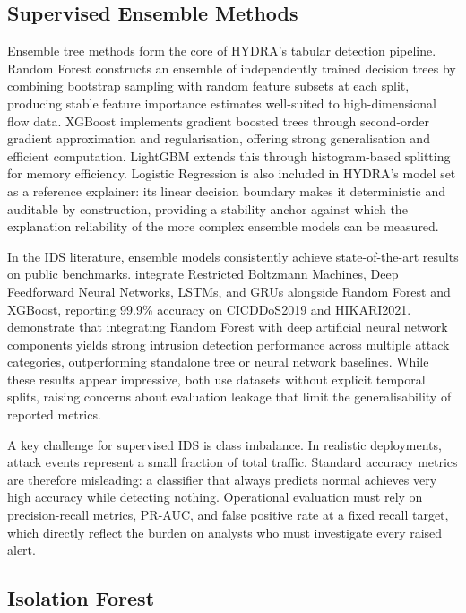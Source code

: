 \documentclass[12pt,a4paper]{report}
\begin{document}
\subsection{Supervised Ensemble Methods}
\label{sec:ensemble}

Ensemble tree methods form the core of HYDRA's tabular detection pipeline. Random Forest \citep{breiman2001} constructs an ensemble of independently trained decision trees by combining bootstrap sampling with random feature subsets at each split, producing stable feature importance estimates well-suited to high-dimensional flow data. XGBoost \citep{chen2016} implements gradient boosted trees through second-order gradient approximation and regularisation, offering strong generalisation and efficient computation. LightGBM \citep{ke2017} extends this through histogram-based splitting for memory efficiency. Logistic Regression is also included in HYDRA's model set as a reference explainer: its linear decision boundary makes it deterministic and auditable by construction, providing a stability anchor against which the explanation reliability of the more complex ensemble models can be measured.

In the IDS literature, ensemble models consistently achieve state-of-the-art results on public benchmarks. \citet{pansare2024} integrate Restricted Boltzmann Machines, Deep Feedforward Neural Networks, LSTMs, and GRUs alongside Random Forest and XGBoost, reporting 99.9\% accuracy on CICDDoS2019 and HIKARI2021. \citet{rani2024} demonstrate that integrating Random Forest with deep artificial neural network components yields strong intrusion detection performance across multiple attack categories, outperforming standalone tree or neural network baselines. While these results appear impressive, both use datasets without explicit temporal splits, raising concerns about evaluation leakage that limit the generalisability of reported metrics.

A key challenge for supervised IDS is class imbalance. In realistic deployments, attack events represent a small fraction of total traffic. Standard accuracy metrics are therefore misleading: a classifier that always predicts normal achieves very high accuracy while detecting nothing. Operational evaluation must rely on precision-recall metrics, PR-AUC, and false positive rate at a fixed recall target, which directly reflect the burden on analysts who must investigate every raised alert.

\subsection{Isolation Forest}
\label{sec:iforest}
\end{document}
